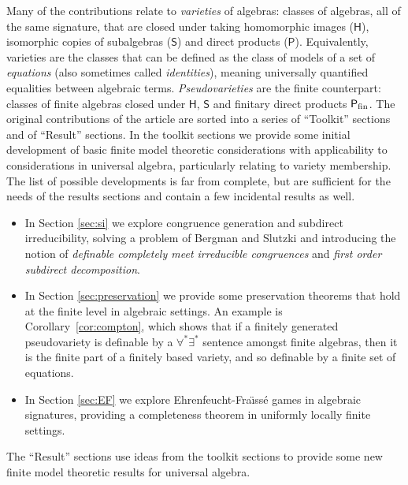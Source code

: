 \documentclass[reqno]{amsart}
\theoremstyle{plain}
\theoremstyle{definition}
\begin{document}
Many of the contributions relate to \emph{varieties} of algebras: classes of algebras, all of the same signature, that are closed under taking homomorphic images ($\mathsf{H}$), isomorphic copies of subalgebras ($\mathsf{S}$) and direct products ($\mathsf{P}$).  
Equivalently, varieties are the classes that can be defined as the class of models of a set of \emph{equations} (also sometimes called \emph{identities}), meaning universally quantified equalities between algebraic terms.
\emph{Pseudovarieties} are the finite counterpart: classes of finite algebras closed under $\mathsf{H}$, $\mathsf{S}$ and finitary direct products $\mathsf{P}_{\rm fin}$.
The original contributions of the article are sorted into a series of ``Toolkit'' sections and of ``Result'' sections.  
In the toolkit sections we provide some initial development of  basic finite model theoretic considerations with applicability to  considerations in universal algebra, particularly relating to variety membership.  
The list of possible developments is far from complete, but are sufficient for the needs of the results sections and contain a few incidental results as well. 
\begin{itemize}
\item In Section \ref{sec:si} we explore congruence generation and subdirect irreducibility, solving a problem of Bergman and Slutzki \cite{berslu02} and introducing the notion of \emph{definable completely meet irreducible congruences} and \emph{first order subdirect decomposition}.
\item In Section \ref{sec:preservation} we provide some preservation theorems that hold at the finite level in algebraic settings.  An example is Corollary~\ref{cor:compton}, which shows that if a finitely generated pseudovariety is definable by a $\forall^*\exists^*$ sentence amongst finite algebras, then it is the finite part of a finitely based variety, and so definable by a finite set of equations.
\item In Section \ref{sec:EF} we explore Ehrenfeucht-Fra\"{\i}ss\'e games in algebraic signatures, providing a completeness theorem in uniformly locally finite settings.
\end{itemize}
The ``Result'' sections use ideas from the toolkit sections to provide some new finite model theoretic results for universal algebra.
\end{document}

